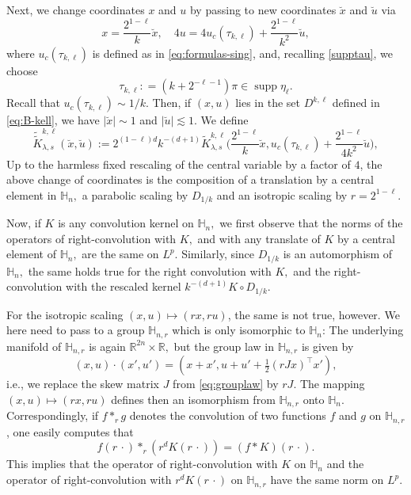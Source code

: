 \documentclass[leqno]{amsart}
\theoremstyle{definition}
\theoremstyle{remark}
\numberwithin{equation}{section}
\newcommand{\R}{\mathbb{R}}
\DeclareMathOperator*{\supp}{supp}
\begin{document}
Next, we change coordinates  $x$ and $u$ by passing to new coordinates $\breve x$ and  $\breve u$ via
\[
x = \frac {2^{1-\ell}}{k} \breve x,\quad 4 u = 4 u_c(\tau_{k,\ell}) + \frac {2^{1-\ell}}{k^2}   \breve u ,
\]
where $u_c(\tau_{k,\ell})$ is defined as in \eqref{eq:formulas-sing}, and, recalling \eqref{supptau}, we choose
\[
\tau_{k,\ell}: = (k+ 2^{-\ell-1})\pi\in \supp \eta_\ell.
\]
Recall that $u_c(\tau_{k,\ell})\sim 1/k$.  Then, if $(x,u)$ lies in the set $D^{k,\ell}$ defined in \eqref{eq:B-kell}, we have $|\breve x| \sim 1$ and $|\breve u|\lesssim 1$. We define
\begin{equation}\label{eq:kl-double-tilde}
\tilde{\tilde K}_{\lambda, s}^{k,\ell} (\breve x,\breve u) := 2^{(1-\ell) d} k^{-(d+1)} \tilde K_{\lambda,s}^{k,\ell} \Big(\frac {2^{1-\ell}}{k} \breve x, u_c(\tau_{k,\ell}) + \frac {2^{1-\ell}}{4 k^2}\breve u\Big),
\end{equation}
Up to the harmless fixed rescaling of the central variable by a factor of $4$, the above change of coordinates is the  composition of a translation by a central element in $\mathbb H_n,$  a parabolic scaling by $D_{1/k}$ and an isotropic scaling by $r=2^{1-\ell}$.

Now, if $K$  is any  convolution kernel on $\mathbb H_n,$  we first observe that the norms of the operators of right-convolution with $K,$ and with any translate of $K$ by a central element of $\mathbb H_n,$ are the same on $L^p.$ Similarly, since $D_{1/k}$  is an automorphism of  $\mathbb H_n,$ the same holds true for the right convolution with $K,$ and 
the right-convolution with the rescaled kernel $k^{-(d+1)} K\circ D_{1/k}$.

For the isotropic scaling $(x,u)\mapsto (rx,ru)$, the same is not true, however. We here need to pass to a group $\mathbb H_{n,r}$ which is only isomorphic to $\mathbb H_n$: The underlying manifold of $\mathbb H_{n,r}$ is again $\R^{2n}\times \R,$ but the group law in $\mathbb H_{n,r}$ is given by 
\[
(x,u)\cdot(x',u')= (x+x', u+u'+\tfrac 12 (rJx)^\intercal  x'),
\]
i.e., we replace the skew matrix $J$ from \eqref{eq:grouplaw} by $rJ$. The mapping $(x,u)\mapsto (rx,ru)$ defines then an isomorphism from $\mathbb H_{n,r}$  onto $\mathbb H_n.$ Correspondingly, if $f\ast_r g$ denotes the convolution of two functions $f$ and $g$ on $\mathbb H_{n,r}$, one easily computes that
\[
f(r\, \cdot)\ast_r  (r^d K(r\,\cdot))=(f\ast K)(r\,\cdot).
\]
This implies that the operator of right-convolution with $K$ on $\mathbb H_n$  and the operator of right-convolution with 
$r^d K(r\,\cdot)$ on $\mathbb H_{n,r}$ have the same norm on $L^p$.
\end{document}
